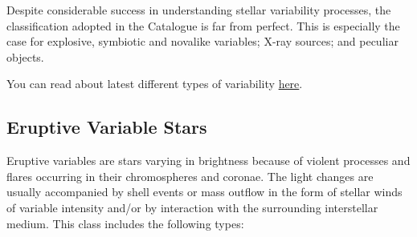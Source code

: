 Despite considerable success in understanding stellar variability
processes, the classification adopted in the Catalogue is far from
perfect. This is especially the case for explosive, symbiotic and
novalike variables; X-ray sources; and peculiar objects.

You can read about latest different types of variability
\href{http://cdsarc.u-strasbg.fr/vizier/ftp/cats/B/gcvs/vartype.txt}{here}.

\subsection{Eruptive Variable Stars}\label{eruptive-variable-stars}

Eruptive variables are stars varying in brightness because of violent
processes and flares occurring in their chromospheres and coronae. The
light changes are usually accompanied by shell events or mass outflow in
the form of stellar winds of variable intensity and/or by interaction
with the surrounding interstellar medium. This class includes the
following types:

